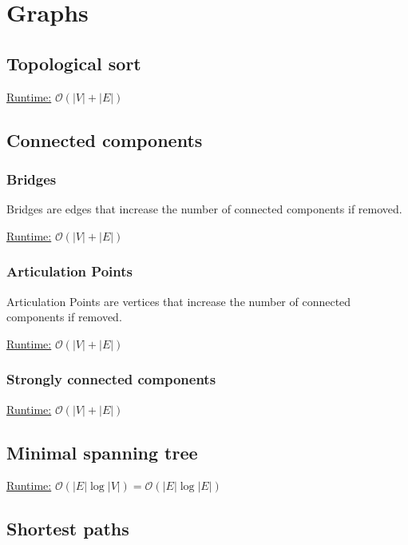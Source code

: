 \section{Graphs}

\subsection{Topological sort}

\underline{Runtime:} $\mathcal{O}(\lvert V \rvert + \lvert E \rvert)$

\subsection{Connected components}

\subsubsection{Bridges}

Bridges are edges that increase the number of connected components if
removed.

\underline{Runtime:} $\mathcal{O}(\lvert V \rvert + \lvert E \rvert)$

\subsubsection{Articulation Points}

Articulation Points are vertices that increase the number of connected
components if removed.

\underline{Runtime:} $\mathcal{O}(\lvert V \rvert + \lvert E \rvert)$

\subsubsection{Strongly connected components}
\underline{Runtime:} $\mathcal{O}(\lvert V \rvert + \lvert E \rvert)$


\subsection{Minimal spanning tree}
\underline{Runtime:} $\mathcal{O}(\lvert E \rvert \log \lvert V
\rvert) = \mathcal{O}(\lvert E \rvert \log \lvert E \rvert)$

\subsection{Shortest paths}

